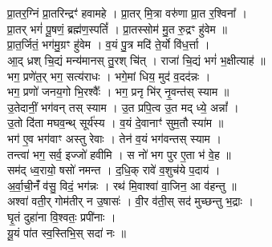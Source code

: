 \section{}
प्रा॒तर॒ग्निं प्रा॒तरिन्द्रꣳ॑ हवामहे । प्रा॒तर् मि॒त्रा वरु॑णा प्रा॒त र॒श्विना᳚ ।\\
प्रा॒तर् भगं॑ पू॒षणं॒ ब्रह्म॑ण॒स्पतिं᳚ । प्रा॒तस्सोम॑ मु॒त रु॒द्रꣳ हु॑वेम ॥\\
प्रा॒त॒र्जितं॒ भग॑मु॒ग्रꣳ हु॑वेम । व॒यं पु॒त्र मदि॑ ते॒र्यो वि॑ध॒र्त्ता ।\\
आ॒द् ध्रश् चि॒द्यं मन्य॑मानस् तु॒रश् चि॑त् । राजा॑ चि॒द्यं भगं॑ भ॒क्षीत्याह॑ ॥\\
भग॒ प्रणे॑त॒र् भग॒ सत्य॑राधः । भगे॒मां धिय॒ मुद॑ व॒दद॑न्नः ।\\
भग॒ प्रणो॑ जनय॒गो भि॒रश्वैः᳚ । भग॒ प्रनृ भि॑र् नृ॒वन्त॑स् स्याम ॥\\
उ॒तेदानीं॒ भग॑वन् तस् स्याम । उ॒त प्रपि॒त्व उ॒त मद् ध्ये॒ अन्नां᳚ ।\\
उ॒तो दि॑ता मघव॒न्थ् सूर्य॑स्य । व॒यं दे॒वानाꣳ॑ सुम॒तौ स्या॑म ॥\\
भग॑ ए॒व भग॑वाꣳ अस्तु रेवाः । तेन॑ व॒यं भग॑वन्तस् स्याम ।\\
तन्त्वा॑ भग॒ सर्व॒ इज्जो॑ हवीमि । स नो॑ भग पुर ए॒ता भ॑ वे॒ह ॥\\
सम॑द् ध्व॒रायो॒ षसो॑ नमन्त । द॒धि॒क् रावे॑ व॒शुच॑ये प॒दाय॑ ।\\
अ॒र्वा॒ची॒नंँ व॑सु॒ विदं॒ भग॑न्नः । रथ॑ मि॒वाश्वा॑ वा॒जिन॒ आ व॑हन्तु ॥\\
अश्वा॑ वती॒र् गोम॑तीर् न उ॒षासः॑ । वी॒र व॑ती॒स् सद॑ मुच्छन्तु भ॒द्राः ।\\
घृ॒तं दुहा॑ना वि॒श्वतः॒ प्रपी॑नाः ।\\
यू॒यं पा॑त स्व॒स्तिभि॒स् सदा॑ नः ॥\\
